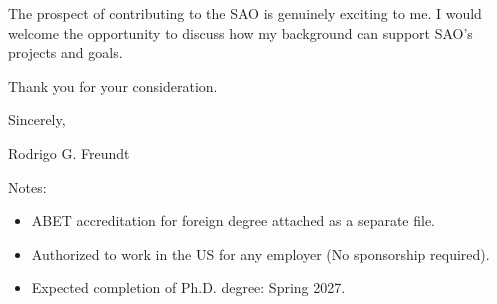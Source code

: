 \documentclass[letterpaper,11pt]{article}
\begin{document}


The prospect of contributing to the SAO is genuinely exciting to me. I would welcome the opportunity to discuss how my background can support SAO's projects and goals.

Thank you for your consideration.

\vspace{1.5em}
Sincerely,

\vspace{2em}
Rodrigo G. Freundt

\vspace{2em}
Notes:
\begin{itemize}
    \item ABET accreditation for foreign degree attached as a separate file.
    \item Authorized to work in the US for any employer (No sponsorship required).
    \item Expected completion of Ph.D. degree: Spring 2027.
\end{itemize}
\end{document}
